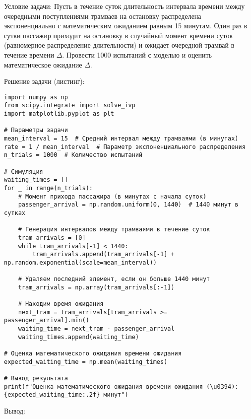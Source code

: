 Условие задачи: Пусть в течение суток длительность интервала времени между очередными поступлениями трамваев на остановку распределена экспоненциально с математическим ожиданием равным 15 минутам. Один раз в сутки пассажир приходит на остановку в случайный момент времени суток (равномерное распределение длительности) и ожидает очередной трамвай в течение времени $\Delta$. Провести 1000 испытаний с моделью и оценить математическое ожидание $\Delta$.

Решение задачи (листинг):

\begin{verbatim}
import numpy as np
from scipy.integrate import solve_ivp
import matplotlib.pyplot as plt

# Параметры задачи
mean_interval = 15  # Средний интервал между трамваями (в минутах)
rate = 1 / mean_interval  # Параметр экспоненциального распределения
n_trials = 1000  # Количество испытаний

# Симуляция
waiting_times = []
for _ in range(n_trials):
    # Момент прихода пассажира (в минутах с начала суток)
    passenger_arrival = np.random.uniform(0, 1440)  # 1440 минут в сутках

    # Генерация интервалов между трамваями в течение суток
    tram_arrivals = [0]
    while tram_arrivals[-1] < 1440:
        tram_arrivals.append(tram_arrivals[-1] + np.random.exponential(scale=mean_interval))

    # Удаляем последний элемент, если он больше 1440 минут
    tram_arrivals = np.array(tram_arrivals[:-1])

    # Находим время ожидания
    next_tram = tram_arrivals[tram_arrivals >= passenger_arrival].min()
    waiting_time = next_tram - passenger_arrival
    waiting_times.append(waiting_time)

# Оценка математического ожидания времени ожидания
expected_waiting_time = np.mean(waiting_times)

# Вывод результата
print(f"Оценка математического ожидания времени ожидания (\u0394): {expected_waiting_time:.2f} минут")

\end{verbatim}

Вывод:

